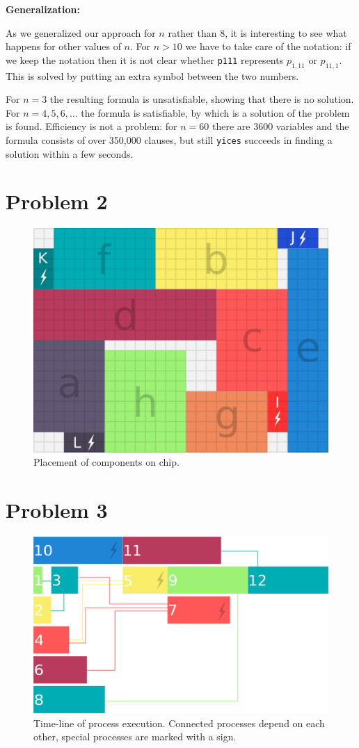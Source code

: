 \documentclass[a4paper]{article}
\begin{document}
\vspace{3mm}

{\bf Generalization:} 

As we generalized our approach for $n$ rather than 8, it is
interesting to see what happens for other values of $n$. For $n
> 10$ we have to take care of the notation: if we keep the
notation then it is not clear whether {\tt p111} represents 
$p_{1,11}$ or $p_{11,1}$. This is solved by putting an extra 
symbol between the two numbers. 

For $n=3$ the resulting formula is unsatisfiable, showing that
there is no solution. For $n = 4,5,6,\ldots$ the formula is
satisfiable, by which is a solution of the problem is found.
Efficiency is not a problem: for $n = 60$ there are 3600
variables and the formula consists of over 350,000 clauses, but 
still {\tt yices} succeeds in finding a solution within a few
seconds.
	\section{Problem 2}
	\begin{figure}[H]
		\centering
			\includegraphics[scale=0.5]{power-grid-2.png}
		\caption{Placement of components on chip.}
	\end{figure}
	\section{Problem 3}
	\begin{figure}[H]
		\centering
			\includegraphics[scale=0.7]{timeline.png}
		\caption{Time-line of process execution. Connected processes depend on each other, special processes are marked with a sign.}
	\end{figure}
\end{document}
